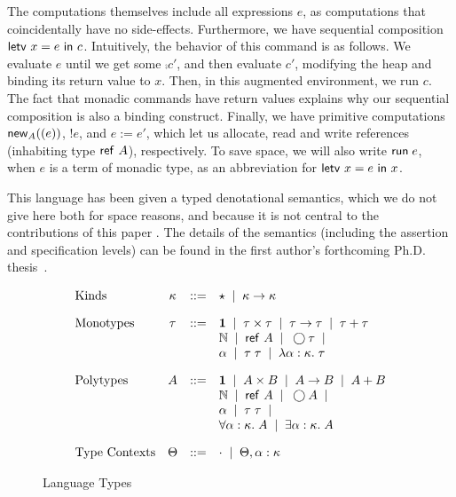 \documentclass[preprint,natbib]{sigplanconf}
\begin{document}
The computations themselves include all expressions $e$, as
computations that coincidentally have no side-effects. Furthermore, we
have sequential composition $\mbox{\textsf{{letv }}}x = e\mbox{\textsf{{ in }}}c$. Intuitively, the
behavior of this command is as follows. We evaluate $e$ until we get
some $\comp{c'}$, and then evaluate $c'$, modifying the heap and
binding its return value to $x$. Then, in this augmented environment,
we run $c$. The fact that monadic commands have return values explains
why our sequential composition is also a binding construct. Finally,
we have primitive computations $\mbox{\textsf{{new}}}_{A}((e))$, $!e$, and $e := e'$,
which let us allocate, read and write references (inhabiting type
$\mbox{\textsf{{ref }}}A$), respectively. To save space, we will also write
$\mbox{\textsf{{run}}}\;e$, when $e$ is a term of monadic type, as an
abbreviation for $\mbox{\textsf{{letv }}}x = e\mbox{\textsf{{ in }}}x$.

This language has been given a typed denotational semantics, which we
do not give here both for space reasons, and because it is not central
to the contributions of this paper . The details of the semantics
(including the assertion and specification levels) can be found in the
first author's forthcoming Ph.D. thesis~\cite{tech-report}.

\begin{figure}
\begin{displaymath}
  \begin{array}{lcll}
    \mbox{Kinds} & 
      \kappa & ::= & \star \;\;|\;\; \kappa \to \kappa 
    \\[1em]
     \mbox{Monotypes} & 
      \tau & ::= & 
         \mathbf{1} \;\;|\;\; 
         \tau \times \tau \;\;|\;\; 
         \tau \to \tau \;\;|\;\; 
         \tau + \tau \\
     &&& \mathbb{N} \;\;|\;\; 
         \mbox{\textsf{{ref }}}A \;\;|\;\;
         \bigcirc{\tau} \;\;|\;\; \\
     &&& \alpha \;\;|\;\;
         \tau\;\tau \;\;|\;\; 
         \lambda \alpha:\kappa.\;\tau 
    \\[1em]
    \mbox{Polytypes} & 
      A & ::= & 
         \mathbf{1} \;\;|\;\; 
         A \times B \;\;|\;\; 
         A \to B \;\;|\;\;
         A + B \\
    &&&  \mathbb{N} \;\;|\;\; 
         \mbox{\textsf{{ref }}}A \;\;|\;\;
         \bigcirc{A} \;\;|\;\; \\
    &&&  \alpha \;\;|\;\;
         \tau\;\tau \;\;|\;\; \\
    &&&  \forall \alpha:\kappa.\; A \;\;|\;\; 
         \exists \alpha:\kappa.\; A \\[1em]
    \mbox{Type Contexts} & 
      \Theta & ::= & \cdot \;\;|\;\; \Theta, \alpha:\kappa \\
  \end{array}
\end{displaymath}
\caption{Language Types}
\label{type-syntax}
\end{figure}
\end{document}
